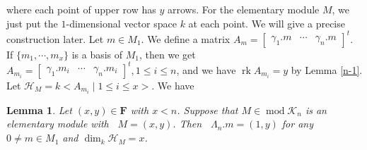 \documentclass[a4paper,12pt]{amsart}
\newcommand{\cH}{\mathcal{H}}
\newcommand{\cK}{\mathcal{K}}
\DeclareMathOperator{\rk}{rk}
\DeclareMathOperator{\modd}{mod}
\DeclareMathOperator{\dimu}{\underline{dim}}
\newtheorem{Lemma}[proposition]{Lemma}
\begin{document}
\begin{center}
\end{center}
where each  point of upper row has $y$  arrows. For the elementary module $M$, we just put the $1$-dimensional vector space $k$ at each point. We will give a precise construction later. Let $m\in M_1$. We define a matrix $A_m=\begin{bmatrix}
\gamma_1.m & \cdots & \gamma_n.m
\end{bmatrix}^t$.  If $\{m_1,\cdots,m_x\}$ is a basis of $M_1$, then we get $A_{m_i}=\begin{bmatrix}
\gamma_1.m_i & \cdots & \gamma_n.m_i
\end{bmatrix}^t, 1\leq i\leq n$, and  we have  $\rk A_{m_i}=y$  by Lemma \ref{n-1}. Let $\cH_M=k<A_{m_i}\mid  1\leq i\leq x>.$   We have

\begin{Lemma}\label{dimen}\cite[Lemma 3.10, Lemma 3.12]{jie}
Let $(x,y)\in \mathbf{F}$ with $x<n$.  Suppose that $M\in\modd \cK_n$ is an elementary module with $\dimu M=(x,y)$.  Then $\dimu \Lambda_n.m=(1,y)$ for any $0\neq m\in M_1$ and $\dim_k \cH_M=x$.

\end{Lemma}
\end{document}

